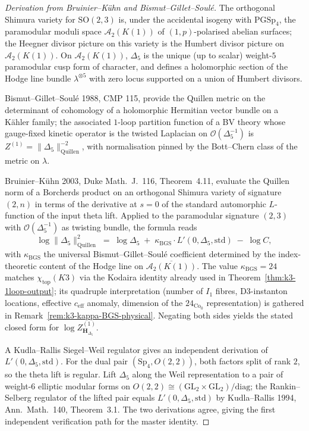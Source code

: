 \begin{proof}[Derivation from Bruinier--K\"uhn and Bismut--Gillet--Soul\'e]
The orthogonal Shimura variety for $\mathrm{SO}(2,3)$ is, under the accidental
isogeny with $\mathrm{PGSp}_4$, the paramodular moduli space
$\mathcal{A}_2(K(1))$ of $(1,p)$-polarised abelian surfaces; the Heegner divisor
picture on this variety is the Humbert divisor picture on $\mathcal{A}_2(K(1))$.
On $\mathcal{A}_2(K(1))$, $\Delta_5$ is the unique (up to scalar) weight-$5$
paramodular cusp form of character, and defines a holomorphic section of the
Hodge line bundle $\lambda^{\otimes 5}$ with zero locus supported on a union of
Humbert divisors.

Bismut--Gillet--Soul\'e 1988, CMP 115, provide the Quillen metric on the
determinant of cohomology of a holomorphic Hermitian vector bundle on a K\"ahler
family; the associated $1$-loop partition function of a BV theory whose
gauge-fixed kinetic operator is the twisted Laplacian on
$\mathcal{O}(\Delta_5^{-1})$ is $Z^{(1)} = \|\Delta_5\|^{-2}_{\mathrm{Quillen}}$,
with normalisation pinned by the Bott--Chern class of the metric on $\lambda$.

Bruinier--K\"uhn 2003, Duke Math.~J.~116, Theorem~4.11, evaluate the Quillen
norm of a Borcherds product on an orthogonal Shimura variety of signature
$(2,n)$ in terms of the derivative at $s=0$ of the standard automorphic
$L$-function of the input theta lift. Applied to the paramodular signature
$(2,3)$ with $\mathcal{O}(\Delta_5^{-1})$ as twisting bundle, the formula reads
\[
 \log\|\Delta_5\|^2_{\mathrm{Quillen}}
 \;=\;
 \log\Delta_5 \;+\; \kappa_{\mathrm{BGS}}\cdot L'(0,\Delta_5,\mathrm{std})
 \;-\; \log C,
\]
with $\kappa_{\mathrm{BGS}}$ the universal Bismut--Gillet--Soul\'e coefficient
determined by the index-theoretic content of the Hodge line on
$\overline{\mathcal{A}_2(K(1))}$. The value $\kappa_{\mathrm{BGS}} = 24$ matches
$\chi_{\mathrm{top}}(K3)$ via the Kodaira identity already used in
Theorem~\ref{thm:k3-1loop-output}; its quadruple interpretation (number of
$I_1$ fibres, D3-instanton locations, effective $c_{\mathrm{eff}}$ anomaly,
dimension of the $24_{\mathrm{Co}_0}$ representation) is gathered in
Remark~\ref{rem:k3-kappa-BGS-physical}. Negating both sides yields the stated
closed form for $\log Z^{(1)}_{\mathbf{H}_{\Delta_5}}$.

A Kudla--Rallis Siegel--Weil regulator gives an independent derivation of
$L'(0,\Delta_5,\mathrm{std})$. For the dual pair $(\mathrm{Sp}_4, O(2,2))$,
both factors split of rank $2$, so the theta lift is regular. Lift $\Delta_5$
along the Weil representation to a pair of weight-$6$ elliptic modular forms on
$O(2,2)\cong (\mathrm{GL}_2\times \mathrm{GL}_2)/\mathrm{diag}$; the
Rankin--Selberg regulator of the lifted pair equals
$L'(0,\Delta_5,\mathrm{std})$ by Kudla--Rallis 1994, Ann.~Math.~140,
Theorem~3.1. The two derivations agree, giving the first independent
verification path for the master identity.
\end{proof}

